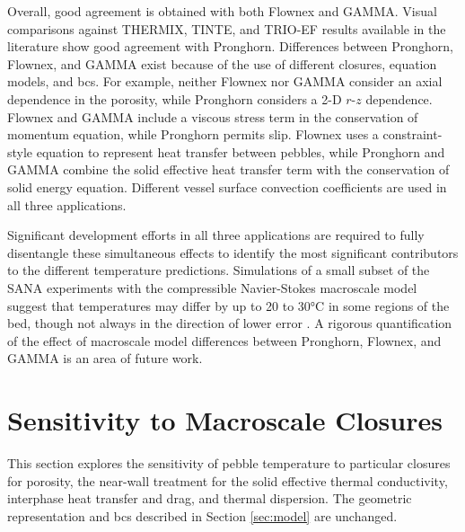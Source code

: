 Overall, good agreement is obtained with both Flownex and GAMMA. Visual comparisons against THERMIX, TINTE, and TRIO-EF results available in the literature \cite{tecdoc1163} show good agreement with Pronghorn. Differences between Pronghorn, Flownex, and GAMMA exist because of the use of different closures, equation models, and \glspl{bc}. For example, neither Flownex nor GAMMA consider an axial dependence in the porosity, while Pronghorn considers a 2-D \(r\)-\(z\) dependence. Flownex and GAMMA include a viscous stress term in the conservation of momentum equation, while Pronghorn permits slip. Flownex uses a constraint-style equation to represent heat transfer between pebbles, while Pronghorn and GAMMA combine the solid effective heat transfer term with the conservation of solid energy equation. Different vessel surface convection coefficients are used in all three applications.

Significant development efforts in all three applications are required to fully disentangle these simultaneous effects to identify the most significant contributors to the different temperature predictions. Simulations of a small subset of the SANA experiments with the compressible Navier-Stokes macroscale model suggest that temperatures may differ by up to 20 to 30\si{\celsius} in some regions of the bed, though not always in the direction of lower error \cite{schunert_phr}. A rigorous quantification of the effect of macroscale model differences between Pronghorn, Flownex, and GAMMA is an area of future work. 

\section{Sensitivity to Macroscale Closures}
\label{sec:sensitivity}

This section explores the sensitivity of pebble temperature to particular closures for porosity, the near-wall treatment for the solid effective thermal conductivity, interphase heat transfer and drag, and thermal dispersion. The geometric representation and \glspl{bc} described in Section \ref{sec:model} are unchanged.


